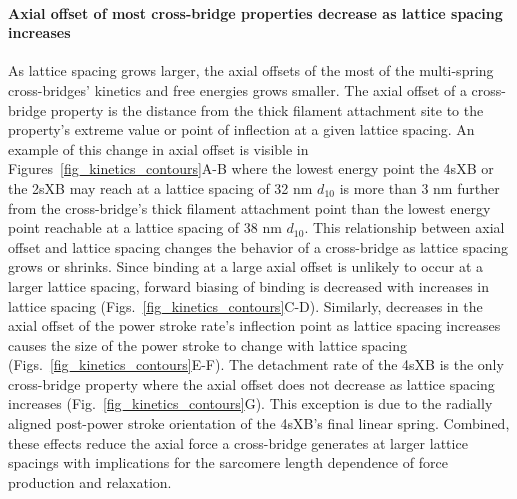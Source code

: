 \documentclass[]{article}
\begin{document}
\paragraph{Axial offset of most cross-bridge properties decrease as lattice spacing increases} %
As lattice spacing grows larger, the axial offsets of the most of the multi-spring cross-bridges' kinetics and free energies grows smaller.
The axial offset of a cross-bridge property is the distance from the thick filament attachment site to the property's extreme value or point of inflection at a given lattice spacing. 
An example of this change in axial offset is visible in Figures~\ref{fig_kinetics_contours}A-B where the lowest energy point the 4sXB or the 2sXB may reach at a lattice spacing of 32 nm $d_{10}$ is more than 3 nm further from the cross-bridge's thick filament attachment point than the lowest energy point reachable at a lattice spacing of 38 nm $d_{10}$.
This relationship between axial offset and lattice spacing changes the behavior of a cross-bridge as lattice spacing grows or shrinks.
Since binding at a large axial offset is unlikely to occur at a larger lattice spacing, forward biasing of binding is decreased with increases in lattice spacing (Figs.~\ref{fig_kinetics_contours}C-D). 
Similarly, decreases in the axial offset of the power stroke rate's inflection point as lattice spacing increases causes the size of the power stroke to change with lattice spacing (Figs.~\ref{fig_kinetics_contours}E-F).
The detachment rate of the 4sXB is the only cross-bridge property where the axial offset does not decrease as lattice spacing increases (Fig.~\ref{fig_kinetics_contours}G).
This exception is due to the radially aligned post-power stroke orientation of the 4sXB's final linear spring. 
Combined, these effects reduce the axial force a cross-bridge generates at larger lattice spacings with implications for the sarcomere length dependence of force production and relaxation. 
\end{document}
